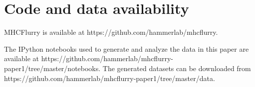 \section{Code and data availability}
MHCFlurry is available at https://github.com/hammerlab/mhcflurry.

The IPython\cite{Perez_2007} notebooks used to generate and analyze the data in this paper are available at https://github.com/hammerlab/mhcflurry-paper1/tree/master/notebooks. The generated datasets can be downloaded from https://github.com/hammerlab/mhcflurry-paper1/tree/master/data.

